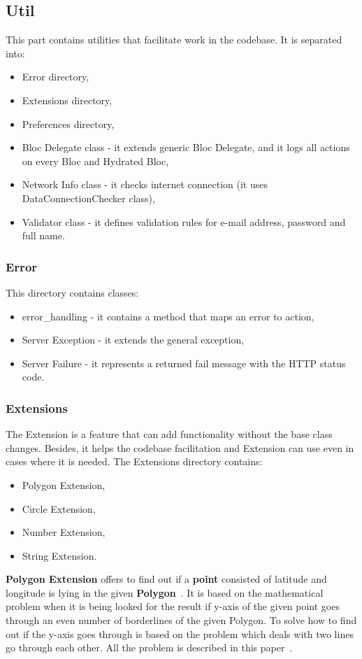 \subsection{Util}\label{subsec:util}
This part contains utilities that facilitate work in the codebase.
It is separated into:
\begin{itemize}
    \item Error directory,
    \item Extensions directory,
    \item Preferences directory,
    \item Bloc Delegate class - it extends generic Bloc Delegate, and it logs all actions on every Bloc and Hydrated Bloc,
    \item Network Info class - it checks internet connection (it uses DataConnectionChecker class),
    \item Validator class - it defines validation rules for e-mail address, password and full name.
\end{itemize}


\subsubsection{Error}\label{subsubsec:error}
This directory contains classes:
\begin{itemize}
    \item error\_handling - it contains a method that maps an error to action,
    \item Server Exception - it extends the general exception,
    \item Server Failure - it represents a returned fail message with the HTTP status code.
\end{itemize}


\subsubsection{Extensions}\label{subsubsec:extensions}
The Extension is a feature that can add functionality without the base class changes.
Besides, it helps the codebase facilitation and Extension can use even in cases where it is needed.
The Extensions directory contains:
\begin{itemize}
    \item Polygon Extension,
    \item Circle Extension,
    \item Number Extension,
    \item String Extension.
\end{itemize}
\textbf{Polygon Extension} offers to find out if a \textbf{point} consisted of latitude and longitude is lying in the given \textbf{Polygon}~\cite{googleMapsPolygon}.
It is based on the mathematical problem when it is being looked for the result if y-axis of the given point goes through an even number of borderlines of the given Polygon.
To solve how to find out if the y-axis goes through is based on the problem which deals with two lines go through each other.
All the problem is described in this paper~\cite{geometricAlgorithms}.

